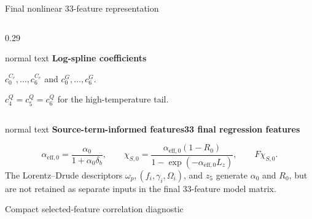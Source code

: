 \documentclass[aspectratio=169,10pt]{beamer}
\begin{document}
\begin{frame}[t]{\fontsize{13}{15}\selectfont Final nonlinear 33-feature representation}
\begin{columns}[T,totalwidth=0.94\textwidth]
\begin{column}{0.29\textwidth}
\begin{beamercolorbox}[wd=\linewidth,sep=0.44em]{normal text}
        \small\textbf{\color{GVCapacityPurple}Log-spline coefficients}\par
        \vspace{0.07cm}
        \scriptsize \(c_0^{C_e},\ldots,c_6^{C_e}\) and \(c_0^G,\ldots,c_6^G\).\par
        \vspace{0.08cm}\tiny \(c_4^Q=c_5^Q=c_6^Q\) for the high-temperature tail.
      \end{beamercolorbox}
    \end{column}
  \end{columns}
  \vspace{0.16cm}
  \begin{beamercolorbox}[wd=0.92\textwidth,sep=0.52em]{normal text}
    \small\textbf{\color{GVCouplingOrange}Source-term-informed features}\hfill\textbf{\color{GVTitleRed}33 final regression features}\par
    \vspace{0.08cm}
    \normalsize
    \[
      \alpha_{\mathrm{eff},0}=\frac{\alpha_0}{1+\alpha_0\delta_b},\qquad
      \chi_{S,0}=\frac{\alpha_{\mathrm{eff},0}(1-R_0)}{1-\exp(-\alpha_{\mathrm{eff},0}L_z)},\qquad
      F\chi_{S,0}.
    \]
    \vspace{-0.03cm}
    \scriptsize The Lorentz--Drude descriptors \(\omega_p,(f_i,\gamma_i,\Omega_i)\), and \(z_5\) generate \(\alpha_0\) and \(R_0\), but are not retained as separate inputs in the final 33-feature model matrix.
  \end{beamercolorbox}
\end{frame}

\begin{frame}[t]{Compact selected-feature correlation diagnostic}
  \hypertarget{supp:sampling-feature-correlation}{}
  \vspace{-0.18cm}\hfill
  \hspace{0.10cm}\GVBackupIndexButton
  \vfill
  \vfill
\end{frame}
\end{document}
